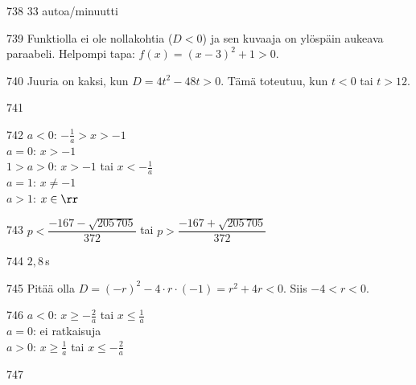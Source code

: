 \begin{Vastaus}{738}
        $33$ autoa/minuutti
    
\end{Vastaus}
\begin{Vastaus}{739}
	Funktiolla ei ole nollakohtia ($D<0$) ja sen kuvaaja on ylöspäin aukeava paraabeli.
    Helpompi tapa: $f(x)= (x-3)^2+1 >0.$
    
\end{Vastaus}
\begin{Vastaus}{740}
		Juuria on kaksi, kun $D=4t^2-48t>0$. Tämä toteutuu, kun $t < 0$ tai $t > 12$.
	
\end{Vastaus}
\begin{Vastaus}{741}
    
\end{Vastaus}
\begin{Vastaus}{742}
        $a < 0$: $-\frac{1}{a} > x > -1$ \\ $a = 0$: $x > -1$ \\ $1 > a > 0$: $x > -1$ tai $x < -\frac{1}{a}$ \\ $a = 1$: $x \neq -1$ \\ $a > 1$: $x \in \rr$
    
\end{Vastaus}
\begin{Vastaus}{743}
        $p<\dfrac{-167-\sqrt{205\,705}}{372}$ tai $p>\dfrac{-167+\sqrt{205\,705}}{372}$
    
\end{Vastaus}
\begin{Vastaus}{744}
	$2,8$\,s
    
\end{Vastaus}
\begin{Vastaus}{745}
		Pitää olla $D=(-r)^2-4 \cdot r \cdot (-1)=r^2+4r<0$. Siis $-4 < r < 0$.
	
\end{Vastaus}
\begin{Vastaus}{746}
        $a < 0$: $x \geq -\frac{2}{a}$ tai $x \leq \frac{1}{a}$ \\ $a = 0$: ei ratkaisuja \\ $a > 0$: $x \geq \frac{1}{a}$ tai $x \leq -\frac{2}{a}$
    
\end{Vastaus}
\begin{Vastaus}{747}
	
\end{Vastaus}
